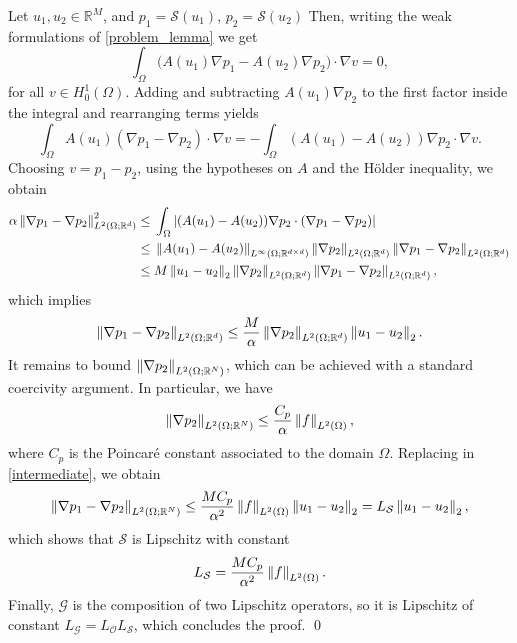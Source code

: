 Let $u_1, u_2 \in \mathbb{R}^M$, and $p_1 = \mathcal S(u_1)$, $p_2 = \mathcal S(u_2)$ Then, writing the weak formulations of \eqref{problem_lemma} we get
	\begin{equation*}
	\int_\Omega \big(A(u_1)\nabla p_1 - A(u_2) \nabla p_2\big) \cdot \nabla v = 0,	
	\end{equation*}
	for all $v \in H^1_0(\Omega)$. Adding and subtracting $A(u_1) \nabla p_2$ to the first factor inside the integral and rearranging terms yields
\begin{equation*}
\int_{\Omega} A(u_1) (\nabla p_1 - \nabla p_2) \cdot \nabla v = - \int_{\Omega} (A(u_1) - A(u_2)) \nabla p_2 \cdot \nabla v.
\end{equation*}
Choosing $v = p_1 - p_2$, using the hypotheses on $A$ and the H\"older inequality, we obtain
\begin{align*}
\alpha \left\|\nabla p_1 - \nabla p_2\right\|_{L^2(\Omega; \mathbb{R}^d)}^2 \le & \;  \int_{\Omega} \left | (A(u_1) - A(u_2)) \nabla p_2 \cdot (\nabla p_1 - \nabla p_2) \right | \\
\le & \; \left\|A(u_1) - A(u_2)\right\|_{L^{\infty}(\Omega; \mathbb{R}^{d \times d})} \left\|\nabla p_2\right\|_{L^2(\Omega; \mathbb{R}^d)} \left\|\nabla p_1 - \nabla p_2\right\|_{L^2(\Omega; \mathbb{R}^d)} \\
\le & \; M \left\|u_1 - u_2\right\|_2 \left\|\nabla p_2\right\|_{L^2(\Omega; \mathbb{R}^d)} \left\|\nabla p_1 - \nabla p_2\right\|_{L^2(\Omega; \mathbb{R}^d)},
\end{align*}
which implies 
\begin{equation} \label{intermediate}
\left\|\nabla p_1 - \nabla p_2\right\|_{L^2(\Omega; \mathbb{R}^d)} \le \frac{M}{\alpha} \left\|\nabla p_2\right\|_{L^2(\Omega; \mathbb{R}^d)} \left\|u_1 - u_2\right\|_2.
\end{equation}
It remains to bound $\left\|\nabla p_2\right\|_{L^2(\Omega; \mathbb{R}^N)}$, which can be achieved with a standard coercivity argument. In particular, we have
	\begin{equation} 
	\left\|\nabla p_2\right\|_{L^2(\Omega; \mathbb{R}^N)} \le \frac{C_p}{\alpha} \left\|f\right\|_{L^2(\Omega)}, 
	\end{equation}
	where $C_p$ is the Poincaré constant associated to the domain $\Omega$. Replacing in \eqref{intermediate}, we obtain
\begin{equation*}
\left\|\nabla p_1 - \nabla p_2\right\|_{L^2(\Omega; \mathbb{R}^N)} \le \frac{M C_p}{\alpha^2} \left\|f\right\|_{L^2(\Omega)} \left\|u_1 - u_2\right\|_2 = L_{\mathcal{S}} \left\|u_1 - u_2\right\|_2,
\end{equation*}
which shows that $\mathcal{S}$ is Lipschitz with constant
\[ L_{\mathcal{S}} = \frac{M C_p}{\alpha^2} \left\|f\right\|_{L^2(\Omega)}. \]
Finally, $\mathcal{G}$ is the composition of two Lipschitz operators, so it is Lipschitz of constant $L_{\mathcal G} = L_{\mathcal O} L_{\mathcal S}$, which concludes the proof.
\qed

